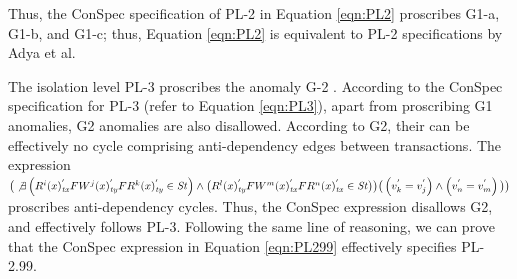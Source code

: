 \documentclass{sig-alternate-05-2015}
\begin{document}
 Thus, the ConSpec
   specification of PL-2 in  Equation \ref{eqn:PL2} proscribes G1-a, G1-b, and G1-c; thus, Equation \ref{eqn:PL2} is
   equivalent to PL-2 specifications by Adya et al.
 \par  The isolation level PL-3 proscribes the anomaly G-2 \cite{DBLP:conf/icde/AdyaLO00}. According to the
 ConSpec specification for PL-3 (refer to Equation \ref{eqn:PL3}), apart from proscribing G1 anomalies, G2 anomalies are
  also disallowed. According to G2, their can be
 effectively no cycle comprising anti-dependency edges between transactions. The expression \\
 $\big( \not\exists  \left({R^i}(x)^{'}_\mathit{tx} F {W^j}(x)^{'}_\mathit{ty} F {R^k}(x)^{'}_\mathit{ty} \in \mathit{St} \right) \wedge \\
  \big( {R^l}(x)^{'}_\mathit{ty} F {W^m}(x)^{'}_\mathit{tx} F {R^n}(x)^{'}_\mathit{tx} \in \mathit{St} \big)  \big) \big(  \left( v_k^{'} = v_j^{'} \right) \wedge
 \left( v_n^{'} = v_m^{'} \right) \big) \big)$ proscribes anti-dependency cycles. Thus, the
 ConSpec expression disallows G2, and effectively follows PL-3. Following the same line of reasoning, we can
  prove that the ConSpec expression in Equation \ref{eqn:PL299} effectively  specifies PL-2.99.
\end{document}
